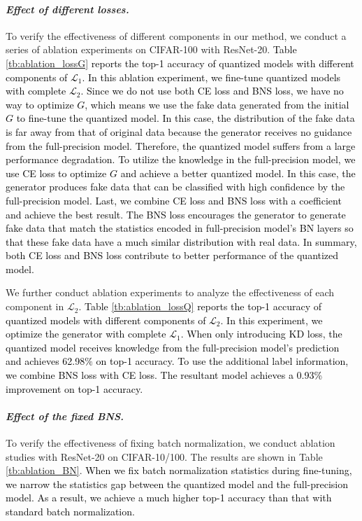\documentclass[runningheads]{llncs}
\def\mL{{\mathcal L}}
\def\lhk{\textcolor{black}}
\def\jing{\textcolor{black}}
\def\new{\textcolor{black}}
\begin{document}
\paragraph{\emph{\textbf{Effect of different losses.}}}
To verify the effectiveness of different components in our method, we conduct a series of ablation experiments on CIFAR-100 with ResNet-20. 
\lhk{Table \ref{tb:ablation_lossG} reports the top-1 accuracy of quantized models with different components of $\mL_{1}$. In this ablation experiment, we fine-tune quantized models with complete $\mL_{2}$. Since we do not use both CE loss and BNS loss, we have no way to optimize $G$, which means we use the fake data generated from the initial $G$ to fine-tune the quantized model. In this case, the distribution of the fake data is far away from that of original data because the generator \new{receives} no guidance from the full-precision model. Therefore, the quantized model suffers \jing{from a large} performance degradation. To utilize the knowledge in the full-precision model, we use CE loss to optimize $G$ and achieve a better quantized model. In this case, the generator produces fake data that can be classified with high confidence by the full-precision model. Last, we combine CE loss and BNS loss with a coefficient and achieve the best result. The BNS loss encourages the generator to generate fake data that match the statistics encoded in full-precision model's BN layers so that these fake data have \new{a} much similar distribution with real data. In summary, \jing{both CE loss and BNS loss contribute to better performance of the quantized model.}}

We further conduct ablation experiments to analyze the effectiveness of each component in $\mL_{2}$.
\lhk{Table \ref{tb:ablation_lossQ} reports the top-1 accuracy of quantized models with different components of $\mL_{2}$. In this experiment, we optimize the generator with complete $\mL_{1}$. When only introducing KD loss, the quantized model receives knowledge from the full-precision model's prediction and achieves 62.98$\%$ on top-1 accuracy. To use the additional label information, we combine BNS loss with CE loss. \jing{The resultant model achieves a 0.93\% improvement on top-1 accuracy. }}

\paragraph{\emph{\textbf{Effect of the fixed BNS.}}}
To verify the effectiveness of fixing batch normalization, we conduct ablation studies with ResNet-20 on CIFAR-10/100. The results are shown in Table \ref{tb:ablation_BN}. 
\lhk{When we fix batch normalization statistics during fine-tuning, we narrow the statistics gap between the quantized model and the full-precision model. As a result, we achieve a much higher top-1 accuracy than that with standard batch normalization. }
\end{document}
